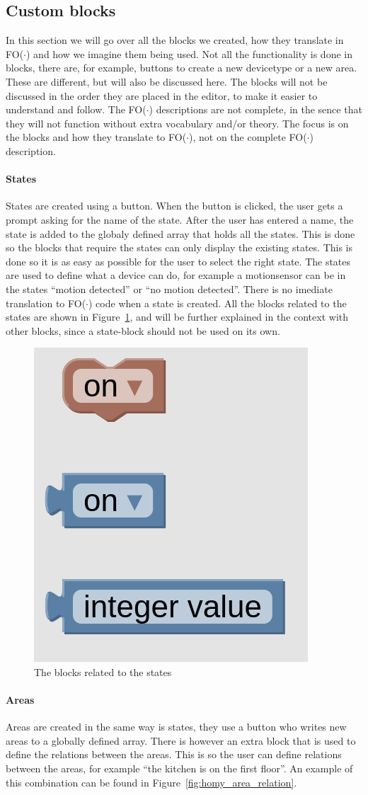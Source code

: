 \documentclass[11pt,a4paper]{report}
\newcommand{\fodot}{FO($\cdot$)\xspace}
\begin{document}
\subsection{Custom blocks}
In this section we will go over all the blocks we created, how they translate in \fodot and how we imagine them being used. Not all the functionality is done in blocks, there are, for example, buttons to create a new devicetype or a new area. These are different, but will also be discussed here. The blocks will not be discussed in the order they are placed in the editor, to make it easier to understand and follow. The \fodot descriptions are not complete, in the sence that they will not function without extra vocabulary and/or theory. The focus is on the blocks and how they translate to \fodot, not on the complete \fodot description.

\paragraph{States}
States are created using a button. When the button is clicked, the user gets a prompt asking for the name of the state. After the user has entered a name, the state is added to the globaly defined array that holds all the states. This is done so the blocks that require the states can only display the existing states. This is done so it is as easy as possible for the user to select the right state. The states are used to define what a device can do, for example a motionsensor can be in the states ``motion detected'' or ``no motion detected''. There is no imediate translation to \fodot code when a state is created. All the blocks related to the states are shown in Figure~\ref{fig:homy_state_blocks}, and will be further explained in the context with other blocks, since a state-block should not be used on its own.

\begin{figure}
    \centering
    \includegraphics[width=0.2\linewidth]{images/homy_state_blocks.png}
    \caption{The blocks related to the states}
    \label{fig:homy_state_blocks}
\end{figure}

\paragraph{Areas}
Areas are created in the same way is states, they use a button who writes new areas to a globally defined array. There is however an extra block that is used to define the relations between the areas. This is so the user can define relations between the areas, for example ``the kitchen is on the first floor''. An example of this combination can be found in Figure~\ref{fig:homy_area_relation}.
\end{document}
